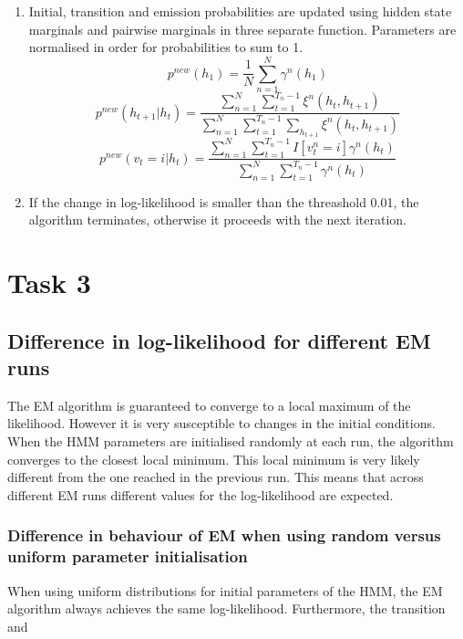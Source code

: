 \documentclass[a4paper, 11pt]{article}
\begin{document}
\begin{enumerate}
\item Initial, transition and emission probabilities are updated using hidden state marginals and pairwise marginals in three separate function. Parameters are normalised in order for probabilities to sum to 1.
\begin{equation}
p^{new}(h_1) = \frac{1}{N}\sum\limits_{n=1}^N \gamma^n(h_1) 
\end{equation}
\begin{equation}
p^{new}(h_{t+1}|h_t) = \frac{\sum\limits_{n=1}^N \sum\limits_{t=1}^{T_n-1}\xi^n(h_t,h_{t+1})}
{ \sum\limits_{n=1}^N \sum\limits_{t=1}^{T_n-1} \sum\limits_{h_{t+1}} \xi^n(h_t,h_{t+1})}
\end{equation}
\begin{equation}
p^{new}(v_t=i|h_t) = \frac{\sum\limits_{n=1}^N \sum\limits_{t=1}^{T_n-1}  I[v_t^n = i] \gamma^n(h_t)}
{ \sum\limits_{n=1}^N \sum\limits_{t=1}^{T_n-1} \gamma^n(h_t)} 
\end{equation}



\item If the change in log-likelihood is smaller than the threashold 0.01, the algorithm terminates, otherwise it proceeds with the next iteration.
\end{enumerate}


\section{Task 3}
\subsection{Difference in log-likelihood for different EM runs}
The EM algorithm is guaranteed to converge to a local maximum of the likelihood. However it is very susceptible to changes in the initial conditions. When the HMM parameters are initialised randomly at each run, the algorithm converges to the closest local minimum. This local minimum is very likely different from the one reached in the previous run. This means that across different EM runs different values for the log-likelihood are expected.

\subsubsection{Difference in behaviour of EM when using random versus uniform parameter initialisation}
When using uniform distributions for initial parameters of the HMM, the EM algorithm always achieves the same log-likelihood. Furthermore, the transition and 
\end{document}
